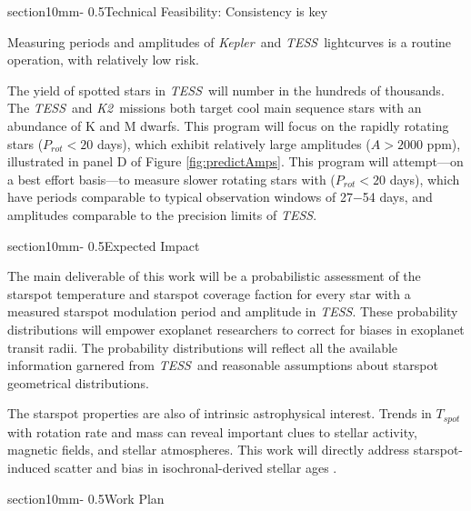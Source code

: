 \documentclass[letterpaper,12pt]{article}
\makeatletter
\renewcommand{\section}{\@startsection%
{section}{1}{0mm}{-\baselineskip}%
{0.5\baselineskip}{\normalfont\Large\bfseries}}%
\newcommand{\tess}{{\it TESS}}
\newcommand{\kepler}{{\it Kepler}}
\newcommand{\ktwo}{{\it K2}}
\makeatother
\begin{document}
\section{Technical Feasibility: Consistency is key}

Measuring periods and amplitudes of \kepler\ and \tess\ lightcurves is a routine operation, with relatively low risk.  

The yield of spotted stars in \tess\ will number in the hundreds of thousands.  The \tess\ and \ktwo\ missions both target cool main sequence stars with an abundance of K and M dwarfs.  This program will focus on the rapidly rotating stars ($P_{rot}<20$ days), which exhibit relatively large amplitudes ($A>2000$ ppm), illustrated in panel D of Figure \ref{fig:predictAmps}.  This program will attempt---on a best effort basis---to measure slower rotating stars with ($P_{rot}<20$ days), which have periods comparable to typical observation windows of 27$-$54 days, and amplitudes comparable to the precision limits of \tess.

\section{Expected Impact}

The main deliverable of this work will be a probabilistic assessment of the starspot temperature and starspot coverage faction for every star with a measured starspot modulation period and amplitude in \tess.  These probability distributions will empower exoplanet researchers to correct for biases in exoplanet transit radii.  The probability distributions will reflect all the available information garnered from \tess\ and reasonable assumptions about starspot geometrical distributions.

The starspot properties are also of intrinsic astrophysical interest.  Trends in $T_{spot}$ with rotation rate and mass can reveal important clues to stellar activity, magnetic fields, and stellar atmospheres.  This work will directly address starspot-induced scatter and bias in isochronal-derived stellar ages \cite{2015ApJ...807..174S, 2017ApJ...836..200G}.




\section{Work Plan}
\end{document}
